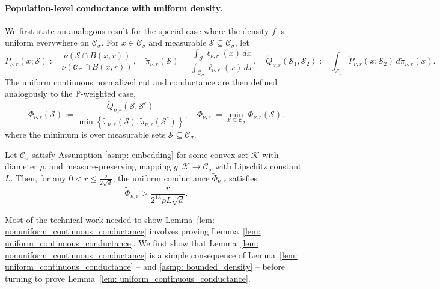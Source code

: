 \documentclass[11pt,twoside]{article}
\newcommand{\set}[1]{\left\{#1\right\}}
\newcommand{\1}{\mathbbm{1}}
\newcommand{\Pbb}{\mathbb{P}}
\newcommand{\Sset}{\mathcal{S}}
\newcommand{\Cset}{\mathcal{C}}
\newcommand{\Csig}{\Cset_{\sigma}}
\newcommand{\dx}{\,dx}
\begin{document}
\paragraph{Population-level conductance with uniform density.}
We first state an analogous result for the special case where the density $f$ is uniform everywhere on $\Csig$. For $x \in \Csig$ and measurable $\Sset \subseteq \Csig$, let 
\begin{equation*}
\widetilde{P}_{\nu,r}(x; \Sset) := \frac{\nu(\Sset \cap B(x,r))}{\nu(\Csig \cap B(x,r))}, \quad \widetilde{\pi}_{\nu,r}(\Sset) = \frac{\int_{\Sset} \ell_{\nu,r}(x) \dx}{\int_{\Csig} \ell_{\nu,r}(x) \dx}, \quad  \widetilde{Q}_{\nu,r}(\Sset_1,\Sset_2) := \int_{\Sset_1} \widetilde{P}_{\nu,r}(x;\Sset_2) \,d\widetilde{\pi}_{\nu,r}(x).
\end{equation*}
The uniform continuous normalized cut and conductance are then defined analogously to the $\Pbb$-weighted case,
\begin{equation*}
\widetilde{\Phi}_{\nu,r}(\Sset) := \frac{\widetilde{Q}_{\nu,r}(\Sset, \Sset^c)}{\min\set{\widetilde{\pi}_{\nu,r}(\Sset),\widetilde{\pi}_{\nu,r}(\Sset^c)}}, \quad \widetilde{\Phi}_{\nu,r} := \min_{\Sset \subseteq \Csig} \widetilde{\Phi}_{\nu,r}(\Sset).
\end{equation*}
where the minimum is over measurable sets $\Sset \subseteq \Csig$.

\begin{lemma}
	\label{lem: uniform_continuous_conductance}
	Let $\Csig$ satisfy Assumption \ref{asmp: embedding} for some convex set $\mathcal{K}$ with diameter $\rho$, and measure-preserving mapping $g: \mathcal{K} \to \Csig$ with Lipschitz constant $L$. Then, for any $0 < r \leq \frac{\sigma}{2\sqrt{d}}$, the uniform conductance $\widetilde{\Phi}_{\nu,r}$ satisfies
	\begin{equation*}
	\widetilde{\Phi}_{\nu,r} > \frac{r}{2^{13} \rho L \sqrt{d}}.
	\end{equation*}
\end{lemma}

Most of the technical work needed to show Lemma~\ref{lem: nonuniform_continuous_conductance} involves proving Lemma~\ref{lem: uniform_continuous_conductance}. We first show that  Lemma~\ref{lem: nonuniform_continuous_conductance} is a simple consequence of Lemma~\ref{lem: uniform_continuous_conductance} -- and \ref{asmp: bounded_density} -- before turning to prove Lemma~\ref{lem: uniform_continuous_conductance}.
\end{document}
